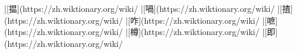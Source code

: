 |[揾](https://zh.wiktionary.org/wiki/%
|[喎](https://zh.wiktionary.org/wiki/%
|[揸](https://zh.wiktionary.org/wiki/%
|[咋](https://zh.wiktionary.org/wiki/%
|[嗻](https://zh.wiktionary.org/wiki/%
|[樽](https://zh.wiktionary.org/wiki/%
|[即](https://zh.wiktionary.org/wiki/%
